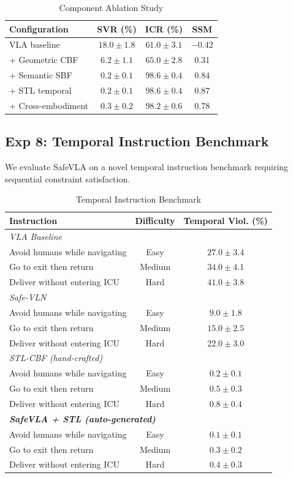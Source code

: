 \documentclass[conference]{IEEEtran}
\begin{document}
\begin{table}[h]
\centering
\caption{Component Ablation Study}
\begin{tabular}{lccc}
\toprule
\textbf{Configuration} & \textbf{SVR (\%)} & \textbf{ICR (\%)} & \textbf{SSM} \\
\midrule
VLA baseline & $18.0 \pm 1.8$ & $61.0 \pm 3.1$ & $-0.42$ \\
+ Geometric CBF & $6.2 \pm 1.1$ & $65.0 \pm 2.8$ & $0.31$ \\
+ Semantic SBF & $0.2 \pm 0.1$ & $98.6 \pm 0.4$ & $0.84$ \\
+ STL temporal & $0.2 \pm 0.1$ & $98.6 \pm 0.4$ & $0.87$ \\
+ Cross-embodiment & $0.3 \pm 0.2$ & $98.2 \pm 0.6$ & $0.78$ \\
\bottomrule
\end{tabular}
\end{table}

\subsection{Exp 8: Temporal Instruction Benchmark}
We evaluate SafeVLA on a novel temporal instruction benchmark requiring sequential constraint satisfaction.

\begin{table}[h]
\centering
\caption{Temporal Instruction Benchmark}
\begin{tabular}{lcc}
\toprule
\textbf{Instruction} & \textbf{Difficulty} & \textbf{Temporal Viol. (\%)} \\
\midrule
\multicolumn{3}{l}{\textit{VLA Baseline}} \\
Avoid humans while navigating & Easy & $27.0 \pm 3.4$ \\
Go to exit then return & Medium & $34.0 \pm 4.1$ \\
Deliver without entering ICU & Hard & $41.0 \pm 3.8$ \\
\midrule
\multicolumn{3}{l}{\textit{Safe-VLN}} \\
Avoid humans while navigating & Easy & $9.0 \pm 1.8$ \\
Go to exit then return & Medium & $15.0 \pm 2.5$ \\
Deliver without entering ICU & Hard & $22.0 \pm 3.0$ \\
\midrule
\multicolumn{3}{l}{\textit{STL-CBF (hand-crafted)~\cite{lindemann2018cbf_stl}}} \\
Avoid humans while navigating & Easy & $0.2 \pm 0.1$ \\
Go to exit then return & Medium & $0.5 \pm 0.3$ \\
Deliver without entering ICU & Hard & $0.8 \pm 0.4$ \\
\midrule
\multicolumn{3}{l}{\textit{\textbf{SafeVLA + STL (auto-generated)}}} \\
Avoid humans while navigating & Easy & $\mathbf{0.1 \pm 0.1}$ \\
Go to exit then return & Medium & $\mathbf{0.3 \pm 0.2}$ \\
Deliver without entering ICU & Hard & $\mathbf{0.4 \pm 0.3}$ \\
\bottomrule
\end{tabular}
\end{table}
\end{document}
